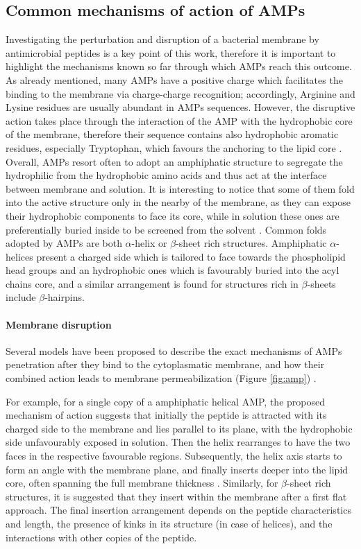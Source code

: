 \subsection{Common mechanisms of action of AMPs} \label{AMP_mechs}
Investigating the perturbation and disruption of a bacterial membrane by antimicrobial peptides is a key point of this work, therefore it is important to highlight the mechanisms known so far through which AMPs reach this outcome.
%
As already mentioned, many AMPs have a positive charge which facilitates the binding to the membrane via charge-charge recognition; accordingly, Arginine and Lysine residues are usually abundant in AMPs sequences. However, the disruptive action takes place through the interaction of the AMP with the hydrophobic core of the membrane, therefore their sequence contains also hydrophobic aromatic residues, especially Tryptophan, which favours the anchoring to the lipid core \cite{Chan2006}.
%
Overall, AMPs resort often to adopt an amphiphatic structure to segregate the hydrophilic from the hydrophobic amino acids and thus act at the interface between membrane and solution. It is interesting to notice that some of them fold into the active structure only in the nearby of the membrane, as they can expose their hydrophobic components to face its core, while in solution these ones are preferentially buried inside to be screened from the solvent \cite{Nguyen2011}.
%
Common folds adopted by AMPs are both $\alpha$-helix or $\beta$-sheet rich structures. Amphiphatic $\alpha$-helices present a charged side which is tailored to face towards the phospholipid head groups and an hydrophobic ones which is favourably buried into the acyl chains core,
%
and a similar arrangement is found for structures rich in $\beta$-sheets include $\beta$-hairpins.


\paragraph{Membrane disruption} Several models have been proposed to describe the exact mechanisms of AMPs penetration after they bind to the cytoplasmatic membrane, and how their combined action leads to membrane permeabilization (Figure \ref{fig:amp}) \cite{Brogden2005,Nguyen2011}.

For example, for a single copy of a amphiphatic helical AMP, the proposed mechanism of action suggests that initially the peptide is attracted with its charged side to the membrane and lies parallel to its plane, with the hydrophobic side unfavourably exposed in solution. Then the helix rearranges to have the two faces in the respective favourable regions. Subsequently, the helix axis starts to form an angle with the membrane plane, and finally inserts deeper into the lipid core, often spanning the full membrane thickness \cite{Ebenhan2014}.
%
Similarly, for $\beta$-sheet rich structures, it is suggested that they insert within the membrane after a first flat approach.
%
The final insertion arrangement depends on the peptide characteristics and length, the presence of kinks in its structure (in case of helices), and the interactions with other copies of the peptide.

